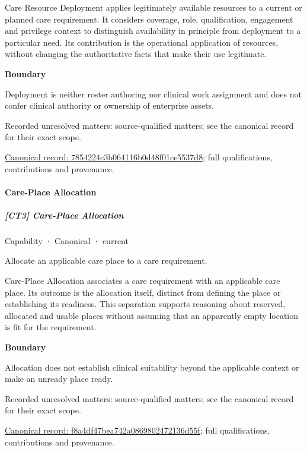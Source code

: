 Care Resource Deployment applies legitimately available resources to a current or planned care requirement. It considers coverage, role, qualification, engagement and privilege context to distinguish availability in principle from deployment to a particular need. Its contribution is the operational application of resources, without changing the authoritative facts that make their use legitimate.



\textbf{Boundary}



Deployment is neither roster authoring nor clinical work assignment and does not confer clinical authority or ownership of enterprise assets.


{\small Recorded unresolved matters: source-qualified matters; see the canonical record for their exact scope.}\par
{\footnotesize \href{../../../../continuum/strategy/capability/7854224c3b064116b0d48f01ce5537d8.md}{Canonical record: 7854224c3b064116b0d48f01ce5537d8}; full qualifications, contributions and provenance.}\par
\paragraph{Care-Place Allocation}

\subparagraph{[CT3] Care-Place Allocation}

\label{element:f8a4df47bea742a0869802472136d55f}
{\small Capability · Canonical · current}\par

Allocate an applicable care place to a care requirement.



Care-Place Allocation associates a care requirement with an applicable care place. Its outcome is the allocation itself, distinct from defining the place or establishing its readiness. This separation supports reasoning about reserved, allocated and usable places without assuming that an apparently empty location is fit for the requirement.



\textbf{Boundary}



Allocation does not establish clinical suitability beyond the applicable context or make an unready place ready.


{\small Recorded unresolved matters: source-qualified matters; see the canonical record for their exact scope.}\par
{\footnotesize \href{../../../../continuum/strategy/capability/f8a4df47bea742a0869802472136d55f.md}{Canonical record: f8a4df47bea742a0869802472136d55f}; full qualifications, contributions and provenance.}\par
